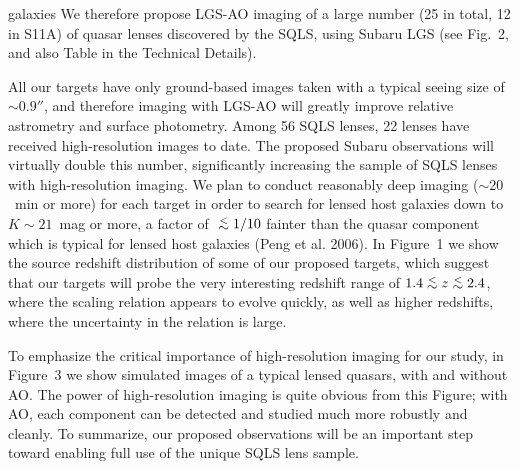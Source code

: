 \documentclass[a4paper,11pt]{article}
\newcommand{\lesssim}{\lower.5ex\hbox{$\; \buildrel < \over \sim \;$}}
\begin{document}
 galaxies
We therefore propose LGS-AO imaging of a large number (25 in total, 12 in S11A)
 of quasar lenses discovered by the SQLS,
using Subaru LGS (see Fig.~2, and also Table in the
Technical Details).

\medskip

All our targets have only ground-based images
taken with a typical seeing size of $\sim 0.9''$, and therefore imaging with LGS-AO will greatly improve relative astrometry
and surface photometry. Among 56 SQLS
lenses, 22 lenses have received high-resolution images to date. The
proposed Subaru observations will virtually double this number, significantly
increasing the sample of SQLS lenses with high-resolution imaging. 
We plan to conduct reasonably deep imaging ($\sim 20$~min or more) for each
target in order to search for lensed host galaxies down to $K \sim
21$~mag or more, a factor of $\lesssim1/10$ fainter than the quasar component
which is typical for lensed host galaxies (Peng et al. 2006). In
Figure~1 we show the source redshift distribution of some of our proposed targets,
which suggest that our targets will probe the very interesting redshift
range of $1.4 \lesssim z \lesssim 2.4$, where the scaling relation
appears to evolve quickly, as well as higher redshifts, where the uncertainty in the relation is large.  

To emphasize the critical importance of high-resolution imaging for
our study, in Figure~3 we show simulated images of a typical lensed
quasars, with and without AO. The power of high-resolution imaging is quite obvious
from this Figure; with AO, each component can be detected and studied
much more robustly and cleanly. To summarize, our proposed
observations will be an important step toward enabling full use of the
unique SQLS lens sample.  

\medskip
\end{document}

